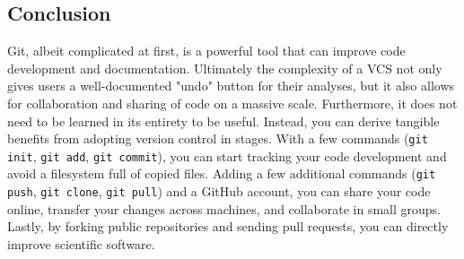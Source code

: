 \subsection{Conclusion}

Git, albeit complicated at first, is a powerful tool that can improve code development and documentation.
Ultimately the complexity of a VCS not only gives users a well-documented "undo" button for their analyses, but it also allows for collaboration and sharing of code on a massive scale.
Furthermore, it does not need to be learned in its entirety to be useful.
Instead, you can derive tangible benefits from adopting version control in stages.
With a few commands (\verb|git init|, \verb|git add|, \verb|git commit|), you can start tracking your code development and avoid a filesystem full of copied files.
Adding a few additional commands (\verb|git push|, \verb|git clone|, \verb|git pull|) and a GitHub account, you can share your code online, transfer your changes across machines, and collaborate in small groups.
Lastly, by forking public repositories and sending pull requests, you can directly improve scientific software.

  